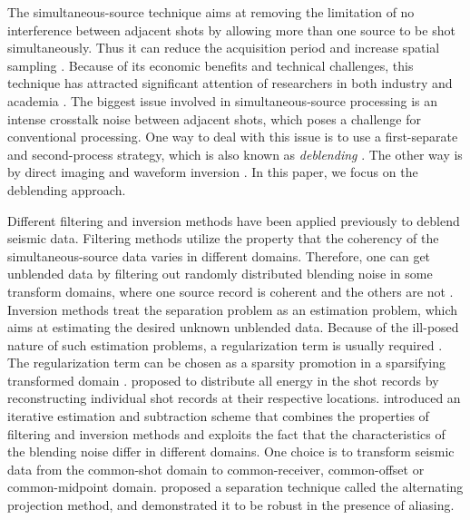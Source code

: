 The simultaneous-source technique aims at removing the limitation of no interference between adjacent shots by allowing more than one source to be shot simultaneously. Thus it can reduce the acquisition period and increase spatial sampling \cite[]{berk}. Because of its economic benefits and technical challenges, this technique has attracted significant attention of researchers in both industry and academia \cite[]{moore2008,mahdad2011,abma,mediandeblend,deblendinv}. The biggest issue involved in simultaneous-source processing is an intense crosstalk noise between adjacent shots, which poses a challenge for conventional processing. One way to deal with this issue is to use a first-separate and second-process strategy, which is also known as \emph{deblending} \cite[]{pana1}. The other way is by direct imaging and waveform inversion \cite[]{berkhout2012,choi2012,plessix2012,guitton2012,zhiguang2014}. In this paper, we focus on the deblending approach.

Different filtering and inversion methods have been applied previously to deblend seismic data. Filtering methods utilize the property that the coherency of the simultaneous-source data varies in different domains. Therefore, one can get unblended data by filtering out randomly distributed blending noise in some transform domains, where one source record is coherent and the others are not \cite[]{gary,iter,mediandeblend}. Inversion methods treat the separation problem as an estimation problem, which aims at estimating the desired unknown unblended data. Because of the ill-posed nature of such estimation problems, a regularization term is usually required \cite[]{pana2}. The regularization term can be chosen as a sparsity promotion in a sparsifying transformed domain \cite[]{abma2010}. \cite{roald} proposed to distribute all energy in the %
shot records by reconstructing individual shot records at their respective locations. \cite{mahdad2011} introduced an iterative estimation and subtraction scheme that combines the properties of filtering and inversion methods and exploits the fact that the characteristics of the blending noise differ in different domains. One choice is to transform seismic data from the common-shot domain to common-receiver, common-offset or common-midpoint domain. \cite{proj} proposed a separation technique called the alternating projection method, and demonstrated it to be robust in the presence of aliasing. 

